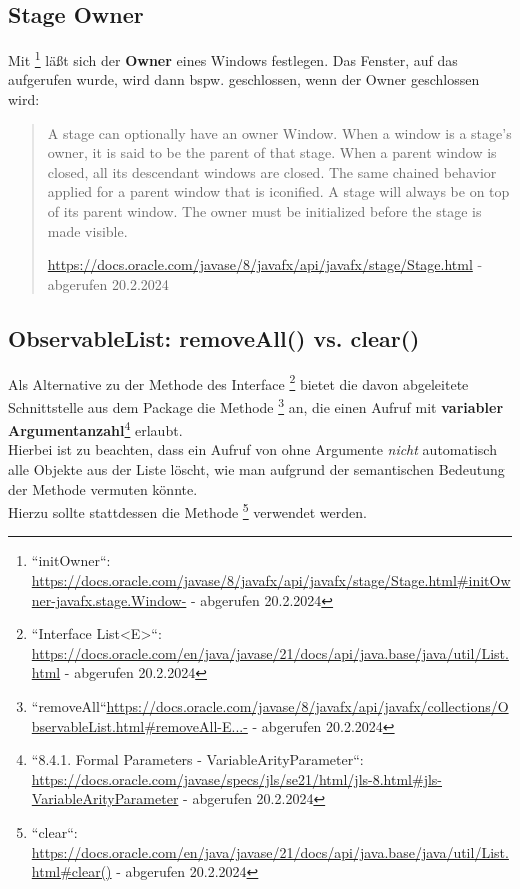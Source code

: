 \subsection*{Stage Owner}

Mit \footnote{
``initOwner``: \url{https://docs.oracle.com/javase/8/javafx/api/javafx/stage/Stage.html#initOwner-javafx.stage.Window-} - abgerufen 20.2.2024
} läßt sich der \textbf{Owner} eines Windows festlegen.
Das Fenster, auf das  aufgerufen wurde, wird dann bspw. geschlossen, wenn der Owner geschlossen wird:

\blockquote[{\url{https://docs.oracle.com/javase/8/javafx/api/javafx/stage/Stage.html} - abgerufen 20.2.2024}]{
    A stage can optionally have an owner Window. When a window is a stage's owner, it is said to be the parent of that stage. When a parent window is closed, all its descendant windows are closed. The same chained behavior applied for a parent window that is iconified. A stage will always be on top of its parent window. The owner must be initialized before the stage is made visible.
}

\subsection*{ObservableList: removeAll() vs. clear()}

Als Alternative zu der Methode  des Interface \footnote{
``Interface List<E>``: \url{https://docs.oracle.com/en/java/javase/21/docs/api/java.base/java/util/List.html} - abgerufen 20.2.2024
} bietet die davon abgeleitete Schnittstelle  aus dem Package  die Methode
\footnote{
    ``removeAll``\url{https://docs.oracle.com/javase/8/javafx/api/javafx/collections/ObservableList.html#removeAll-E...-} - abgerufen 20.2.2024
} an, die einen Aufruf mit \textbf{variabler Argumentanzahl}\footnote{
    ``8.4.1. Formal Parameters - VariableArityParameter``:  \url{https://docs.oracle.com/javase/specs/jls/se21/html/jls-8.html#jls-VariableArityParameter} - abgerufen 20.2.2024
} erlaubt.\\

\noindent
Hierbei ist zu beachten, dass ein Aufruf von  ohne Argumente \textit{nicht} automatisch alle Objekte aus der Liste löscht, wie man aufgrund der semantischen Bedeutung der Methode vermuten könnte.\\
Hierzu sollte stattdessen die Methode \footnote{
``clear``: \url{https://docs.oracle.com/en/java/javase/21/docs/api/java.base/java/util/List.html#clear()} - abgerufen 20.2.2024
} verwendet werden.


